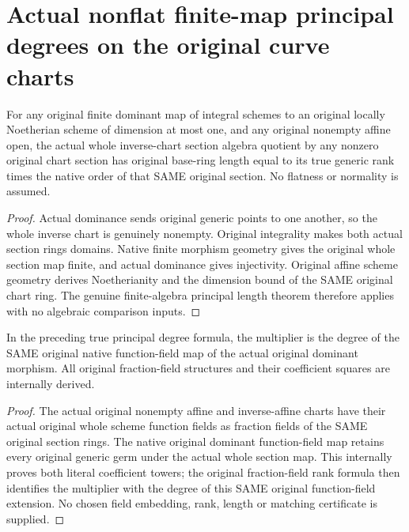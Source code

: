 \section{Actual nonflat finite-map principal degrees on the original curve charts}

\begin{theorem}
\label{thm:fc-scheme-finite-principal-generic-rank}
\leanok
{}
For any original finite dominant map of integral schemes to an
original locally Noetherian scheme of dimension at most one, and
any original nonempty affine open, the actual whole inverse-chart
section algebra quotient by any nonzero original chart section has
original base-ring length equal to its true generic rank times the
native order of that SAME original section. No flatness or
normality is assumed.
\end{theorem}
\begin{proof}
Actual dominance sends original generic points to one another,
so the whole inverse chart is genuinely nonempty. Original
integrality makes both actual section rings domains. Native finite
morphism geometry gives the original whole section map finite,
and actual dominance gives injectivity. Original affine scheme
geometry derives Noetherianity and the dimension bound of the
SAME original chart ring. The genuine finite-algebra principal
length theorem therefore applies with no algebraic comparison
inputs.
\end{proof}

\begin{theorem}
\label{thm:fc-scheme-finite-principal-functionfield-degree}
\leanok
{}
In the preceding true principal degree formula, the multiplier is
the degree of the SAME original native function-field map of the
actual original dominant morphism. All original fraction-field
structures and their coefficient squares are internally derived.
\end{theorem}
\begin{proof}
The actual original nonempty affine and inverse-affine charts have
their actual original whole scheme function fields as fraction
fields of the SAME original section rings. The native original
dominant function-field map retains every original generic germ
under the actual whole section map. This internally proves both
literal coefficient towers; the original fraction-field rank
formula then identifies the multiplier with the degree of this
SAME original function-field extension. No chosen field embedding,
rank, length or matching certificate is supplied.
\end{proof}
